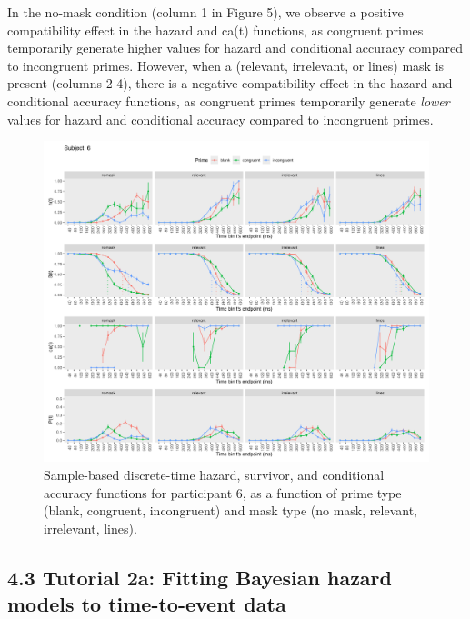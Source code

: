 \documentclass[
  man,floatsintext]{apa6}
\begin{document}
In the no-mask condition (column 1 in Figure 5), we observe a positive compatibility effect in the hazard and ca(t) functions, as congruent primes temporarily generate higher values for hazard and conditional accuracy compared to incongruent primes. However, when a (relevant, irrelevant, or lines) mask is present (columns 2-4), there is a negative compatibility effect in the hazard and conditional accuracy functions, as congruent primes temporarily generate \emph{lower} values for hazard and conditional accuracy compared to incongruent primes.



\begin{figure}[H]

{\centering \includegraphics[width=0.95\linewidth,height=0.67\textheight,]{../Tutorial_1_descriptive_stats/figures/Plot_2IV_for_subject6_PanisSchmidt} 

}

\caption{Sample-based discrete-time hazard, survivor, and conditional accuracy functions for participant 6, as a function of prime type (blank, congruent, incongruent) and mask type (no mask, relevant, irrelevant, lines).}\label{fig:plot-2ivs}
\end{figure}

\subsection{4.3 Tutorial 2a: Fitting Bayesian hazard models to time-to-event data}\label{tutorial-2a-fitting-bayesian-hazard-models-to-time-to-event-data}
\end{document}
